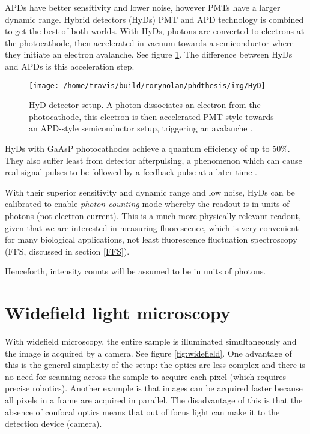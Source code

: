 \documentclass[12pt,]{book}
\theoremstyle{definition}
\theoremstyle{definition}
\theoremstyle{definition}
\theoremstyle{remark}
\let\BeginKnitrBlock\begin \let\EndKnitrBlock\end
\begin{document}
APDs have better sensitivity and lower noise, however PMTs have a larger
dynamic range. Hybrid detectors (HyDs) PMT and APD technology is
combined to get the best of both worlds. With HyDs, photons are
converted to electrons at the photocathode, then accelerated in vacuum
towards a semiconductor where they initiate an electron avalanche. See
figure \ref{fig:HyD}. The difference between HyDs and APDs is this
acceleration step.






\begin{figure}

\texttt{[image: /home/travis/build/rorynolan/phdthesis/img/HyD]} \hfill{}

\caption{HyD detector setup. A photon dissociates an electron
from the photocathode, this electron is then accelerated PMT-style
towards an APD-style semiconductor setup, triggering an avalanche
\citep{LeicaDetectors}.}\label{fig:HyD}
\end{figure}

HyDs with GaAsP photocathodes achieve a quantum efficiency of up to
50\%. They also suffer least from detector afterpulsing, a phenomenon
which can cause real signal pulses to be followed by a feedback pulse at
a later time \citep{afterpulsing}.

With their superior sensitivity and dynamic range and low noise, HyDs
can be calibrated to enable \emph{photon-counting} mode whereby the
readout is in units of photons (not electron current). This is a much
more physically relevant readout, given that we are interested in
measuring fluorescence, which is very convenient for many biological
applications, not least fluorescence fluctuation spectroscopy (FFS,
discussed in section \ref{FFS}).

\BeginKnitrBlock{remark}
\iffalse{} {Remark. } \fi{}Henceforth, intensity counts will be assumed
to be in units of photons.
\EndKnitrBlock{remark}

\section{Widefield light microscopy}\label{widefield-light-microscopy}

With widefield microscopy, the entire sample is illuminated
simultaneously and the image is acquired by a camera. See figure
\ref{fig:widefield}. One advantage of this is the general simplicity of
the setup: the optics are less complex and there is no need for scanning
across the sample to acquire each pixel (which requires precise
robotics). Another example is that images can be acquired faster because
all pixels in a frame are acquired in parallel. The disadvantage of this
is that the absence of confocal optics means that out of focus light can
make it to the detection device (camera).
\end{document}
